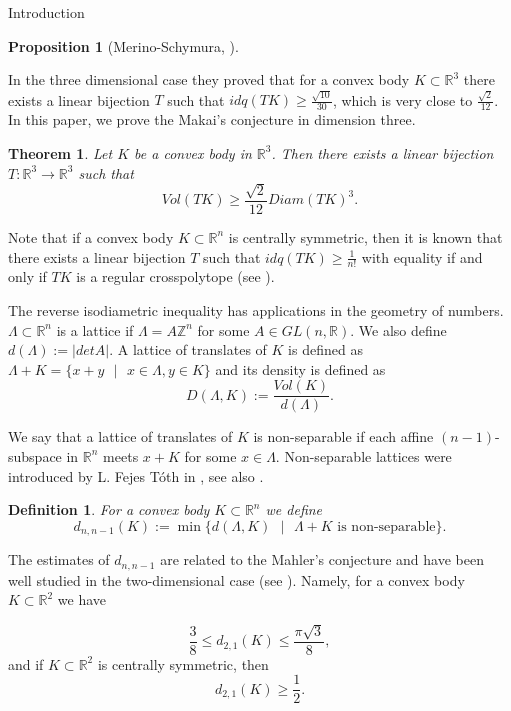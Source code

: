 \documentclass[12pt]{article}
\newcommand\R{\mathbb R}
\newtheorem{theorem}{Theorem}[section]
\newtheorem{proposition}{Proposition}[section]
\newtheorem{definition}{Definition}[section]
\begin{document}
\begin{section}{Introduction}
\begin{proposition}[Merino-Schymura, \cite{shimura}]
    \end{proposition}

    In the three dimensional case they proved that for a convex body $K\subset \mathbb{R}^3$ there exists a linear bijection $T$ such that $idq(TK)\geq \frac{\sqrt{10}}{30}$, which is very close to $\frac{\sqrt{2}}{12}$. In this paper, we prove the Makai's conjecture in dimension three. 

    

    \begin{theorem}
    \label{main-th}
        Let $K$ be a convex body in $\R^{3}$. Then there exists a linear bijection $T:\mathbb{R}^{3}\to \mathbb{R}^{3}$ such that $$
            Vol(TK)\geq \frac{\sqrt{2}}{12}Diam(TK)^3.
        $$      
    \end{theorem}

    Note that if a convex body $K \subset \mathbb{R}^{n}$ is centrally symmetric, then it is known that there exists a linear bijection $T$ such that $idq(TK)\geq \frac{1}{n!}$  with equality if and only if $TK$ is a regular crosspolytope (see \cite{barthe}).

    The reverse isodiametric inequality has applications in the geometry of numbers. $\Lambda\subset \R^{n}$ is a lattice if $\Lambda = A\mathbb{Z}^n$ for some $A\in GL(n,\mathbb{R})$. We also define $d(\Lambda) := |det A|.$ A lattice of translates of $K$ is defined as $\Lambda + K = \{x+y \text{ } \vert\text{ } x\in \Lambda,y\in K\}$ and its density is defined as $$D(\Lambda, K) := \frac{Vol(K)}{d(\Lambda)}.$$     


    We say that a         lattice of translates of $K$ is non-separable if each affine $(n-1)$-subspace in $\R^{n}$ meets $x+K$ for some $x\in\Lambda$. Non-separable lattices were introduced by  L. Fejes T\'oth in \cite{makai1974}, see also \cite{makai1978, makai2016}. 
    \begin{definition} For a convex body $K\subset \mathbb{R}^{n}$ we define 
        $$d_{n,n-1}(K) := \min\{d(\Lambda,K)\text{ }\vert\text{ } \Lambda+K \text{ is non-separable} \}.$$ 
    \end{definition}

    The estimates of $d_{n,n-1}$ are related to the Mahler's conjecture and have been well studied in the two-dimensional case (see \cite{ makai2016, AAA23}). Namely, for a convex body $K\subset \mathbb{R}^2$ we have
    
        $$
            \frac{3}{8}\leq d_{2,1}(K)\leq\frac{\pi \sqrt{3}}{8}, $$ 
    and if $K \subset \mathbb{R}^{2}$ is centrally symmetric, then 
    $$
        d_{2,1}(K)\geq \frac{1}{2}.
    $$
    

\end{section}
\end{document}
